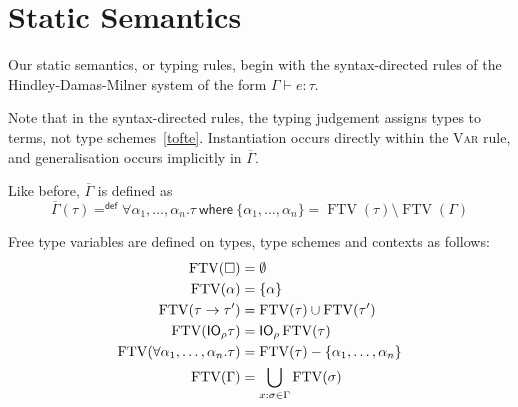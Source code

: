 \section{Static Semantics}

Our static semantics, or typing rules, begin with the syntax-directed
rules of the Hindley-Damas-Milner system of the form $\Gamma \vdash e : \tau$.


Note that in the syntax-directed rules, the typing judgement assigns
types to terms, not type schemes~\ref{tofte}. Instantiation occurs
directly within the \textsc{Var} rule, and generalisation occurs
implicitly in $\overline{\Gamma}$.

\newcommand{\ftv}{\operatorname{FTV}}
\newcommand{\fv}{\operatorname{FV}}

Like before, $\overline{\Gamma}$ is defined as
$$ \overline{\Gamma}(\tau) =^{\textsf{def}} \forall \alpha_1, \ldots, \alpha_n . \tau \
\textsf{where} \ \{ \alpha_1, \ldots, \alpha_n \} = \ftv(\tau) \setminus \ftv(\Gamma)$$

Free type variables are defined on types, type schemes and contexts as
follows:
\begin{align*}
  \ftv(\square) &= \emptyset \\
  \ftv(\alpha) &= \{ \alpha \} \\
  \ftv(\tau \rightarrow \tau') &= \ftv(\tau) \cup \ftv(\tau') \\
  \ftv(\IO_\rho \tau) &= \IO_\rho \ftv(\tau) \\
  \ftv(\forall \alpha_1 , \ldots , \alpha_n . \tau) &= \ftv(\tau) - \{ \alpha_1 , \ldots, \alpha_n \} \\
  \ftv(\Gamma) &= \bigcup_{x : \sigma \in \Gamma} \ftv(\sigma)
\end{align*}

